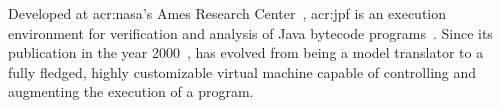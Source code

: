 






Developed at \acrshort{acr:nasa}'s Ames Research Center~\cite{WebNASAAmes2017}, \acrfull{acr:jpf} is an execution environment for verification and analysis of Java bytecode programs~\cite{Visser2003,WebJPF2017}. Since its publication in the year 2000~\cite{Havelund2000}, \jpf{} has evolved from being a model translator to a fully fledged, highly customizable virtual machine capable of controlling and augmenting the execution of a program.

